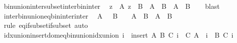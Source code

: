 \begin{isabellebody}
\endisatagproof
{\isafoldproof}%
%
\isadelimproof
\isanewline
%
\endisadelimproof
\isanewline
{}\isamarkupfalse%
\ bin{\isacharunderscore}{\kern0pt}union{\isacharunderscore}{\kern0pt}inter{\isacharunderscore}{\kern0pt}subset{\isacharunderscore}{\kern0pt}inter{\isacharunderscore}{\kern0pt}bin{\isacharunderscore}{\kern0pt}inter{\isacharcolon}{\kern0pt}\isanewline
\ \ {\isachardoublequoteopen}{\isasymlbrakk}z\ {\isasymin}\ A{\isacharsemicolon}{\kern0pt}\ z\ {\isasymin}\ B{\isasymrbrakk}\ {\isasymLongrightarrow}\ {\isasymInter}A\ {\isasymunion}\ {\isasymInter}B\ {\isasymsubseteq}\ {\isasymInter}{\isacharparenleft}{\kern0pt}A\ {\isasyminter}\ B{\isacharparenright}{\kern0pt}{\isachardoublequoteclose}\isanewline
%
\isadelimproof
\ \ %
\endisadelimproof
%
\isatagproof
{}\isamarkupfalse%
\ blast%
\endisatagproof
{\isafoldproof}%
%
\isadelimproof
\isanewline
%
\endisadelimproof
\isanewline
{}\isamarkupfalse%
\ inter{\isacharunderscore}{\kern0pt}bin{\isacharunderscore}{\kern0pt}union{\isacharunderscore}{\kern0pt}eq{\isacharunderscore}{\kern0pt}bin{\isacharunderscore}{\kern0pt}inter{\isacharunderscore}{\kern0pt}inter{\isacharcolon}{\kern0pt}\isanewline
\ \ {\isachardoublequoteopen}{\isasymlbrakk}A\ {\isasymnoteq}\ {\isacharbraceleft}{\kern0pt}{\isacharbraceright}{\kern0pt}{\isacharsemicolon}{\kern0pt}\ B\ {\isasymnoteq}\ {\isacharbraceleft}{\kern0pt}{\isacharbraceright}{\kern0pt}{\isasymrbrakk}\ {\isasymLongrightarrow}\ {\isasymInter}{\isacharparenleft}{\kern0pt}A\ {\isasymunion}\ B{\isacharparenright}{\kern0pt}\ {\isacharequal}{\kern0pt}\ {\isasymInter}A\ {\isasyminter}\ {\isasymInter}B{\isachardoublequoteclose}\isanewline
%
\isadelimproof
\ \ %
\endisadelimproof
%
\isatagproof
{}\isamarkupfalse%
\ {\isacharparenleft}{\kern0pt}rule\ eq{\isacharunderscore}{\kern0pt}if{\isacharunderscore}{\kern0pt}subset{\isacharunderscore}{\kern0pt}if{\isacharunderscore}{\kern0pt}subset{\isacharparenright}{\kern0pt}\ auto%
\endisatagproof
{\isafoldproof}%
%
\isadelimproof
\isanewline
%
\endisadelimproof
\isanewline
{}\isamarkupfalse%
\ idx{\isacharunderscore}{\kern0pt}union{\isacharunderscore}{\kern0pt}insert{\isacharunderscore}{\kern0pt}dom{\isacharunderscore}{\kern0pt}eq{\isacharunderscore}{\kern0pt}bin{\isacharunderscore}{\kern0pt}union{\isacharunderscore}{\kern0pt}idx{\isacharunderscore}{\kern0pt}union{\isacharcolon}{\kern0pt}\ {\isachardoublequoteopen}{\isacharparenleft}{\kern0pt}{\isasymUnion}i\ {\isasymin}\ insert\ A\ B{\isachardot}{\kern0pt}\ C\ i{\isacharparenright}{\kern0pt}\ {\isacharequal}{\kern0pt}\ C\ A\ {\isasymunion}\ {\isacharparenleft}{\kern0pt}{\isasymUnion}i\ {\isasymin}\ B{\isachardot}{\kern0pt}\ C\ i{\isacharparenright}{\kern0pt}{\isachardoublequoteclose}\isanewline

\end{isabellebody}
